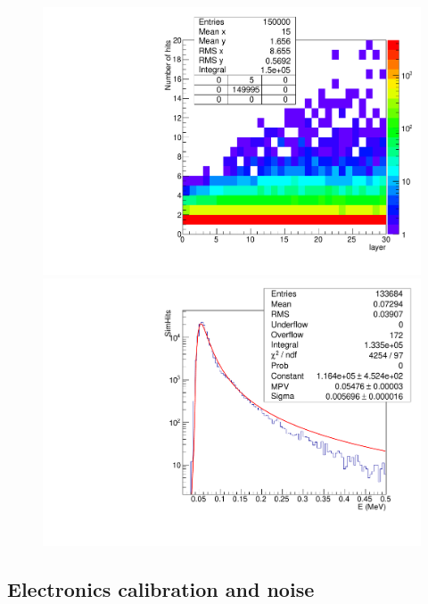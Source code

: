 \begin{figure}[h!]
  \begin{center}
    \includegraphics[width=\cmsFigWidth]{figures/mipHits.pdf}
    \includegraphics[width=\cmsFigWidth]{figures/mipDepositSel.pdf}
    \caption{}
    \label{fig:g4vis}
  \end{center}
\end{figure}


\subsection{Electronics calibration and noise}


